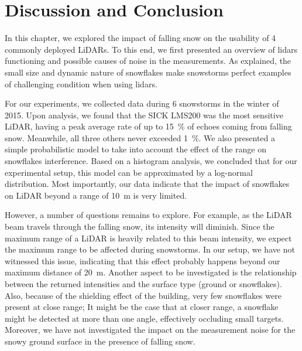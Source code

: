 \section{Discussion and Conclusion}
\label{sec:chap_lidar_conclu}

In this chapter, we explored the impact of falling snow on the usability of 4 commonly deployed LiDARs. To this end, we first presented an overview of \gls*{lidar}s functioning and possible causes of noise in the measurements. As explained, the small size and dynamic nature of snowflakes make snowstorms perfect examples of challenging condition when using \gls*{lidar}s.

For our experiments, we collected data during 6 snowstorms in the winter of 2015. Upon analysis, we found that the SICK LMS200 was the most sensitive LiDAR, having a peak average rate of up to \SI{15}{\percent} of echoes coming from falling snow. Meanwhile, all three others never exceeded \SI{1}{\percent}. We also presented a simple probabilistic model to take into account the effect of the range on snowflakes interference. Based on a histogram analysis, we concluded that for our experimental setup, this model can be approximated by a log-normal distribution. Most importantly, our data indicate that the impact of snowflakes on LiDAR beyond a range of \SI{10}{\meter} is very limited. 

However, a number of questions remains to explore. For example, as the LiDAR beam travels through the falling snow, its intensity will diminish. Since the maximum range of a LiDAR is heavily related to this beam intensity, we expect the maximum range to be affected during snowstorms. In our setup, we have not witnessed this issue, indicating that this effect probably happens beyond our maximum distance of \SI{20}{\meter}. Another aspect to be investigated is the relationship between the returned intensities and the surface type (ground or snowflakes). Also, because of the shielding effect of the building, very few snowflakes were present at close range; It might be the case that at closer range, a snowflake might be detected at more than one angle, effectively occluding small targets. Moreover, we have not investigated the impact on the measurement noise for the snowy ground surface in the presence of falling snow.
